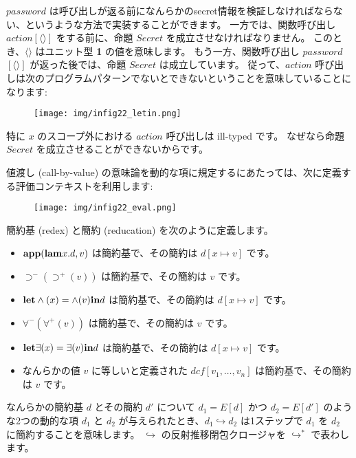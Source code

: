 \documentclass[submit,techreq,noauthor,onecolumn]{ipsj}
\begin{document}
\noindent \underline{$password$} は呼び出しが返る前になんらかのsecret情報を検証しなければならない、というような方法で実装することができます。
一方では、関数呼び出し \underline{$action$}$[\langle\rangle]$ をする前に、命題 \underline{$Secret$} を成立させなければなりません。
このとき、$\langle\rangle$ はユニット型 {\bf 1} の値を意味します。
もう一方、関数呼び出し \underline{$password$}$[\langle\rangle]$ が返った後では、命題 \underline{$Secret$} は成立しています。
従って、\underline{$action$} 呼び出しは次のプログラムパターンでないとできないということを意味していることになります:

\begin{figure}[h]
\centering
\texttt{[image: img/infig22\_letin.png]}
\end{figure}

\noindent 特に $x$ のスコープ外における \underline{$action$} 呼び出しは ill-typed です。
なぜなら命題 \underline{$Secret$} を成立させることができないからです。

値渡し (call-by-value) の意味論を動的な項に規定するにあたっては、次に定義する評価コンテキストを利用します:

\begin{figure}[h]
\centering
\texttt{[image: img/infig22\_eval.png]}
\end{figure}

簡約基 (redex) と簡約 (reducation) を次のように定義します。

\begin{itemize}
  \item ${\bf app}({\bf lam} x.d, v)$ は簡約基で、その簡約は $d[x \mapsto v]$ です。
  \item $\supset^- (\supset^+ (v))$ は簡約基で、その簡約は $v$ です。
  \item ${\bf let} \wedge (x) = \wedge (v) {\bf in} d$ は簡約基で、その簡約は $d[x \mapsto v]$ です。
  \item $\forall^- (\forall^+ (v))$ は簡約基で、その簡約は $v$ です。
  \item ${\bf let} \exists (x) = \exists (v) {\bf in} d$ は簡約基で、その簡約は $d[x \mapsto v]$ です。
  \item なんらかの値 $v$ に等しいと定義された $dcf[v_1,\ldots,v_n]$ は簡約基で、その簡約は $v$ です。
\end{itemize}

\noindent なんらかの簡約基 $d$ とその簡約 $d'$ について $d_1 = E[d]$ かつ $d_2 = E[d']$ のような2つの動的な項 $d_1$ と $d_2$ が与えられたとき、$d_1 \hookrightarrow d_2$ は1ステップで $d_1$ を $d_2$ に簡約することを意味します。
$\hookrightarrow$ の反射推移閉包クロージャを $\hookrightarrow^*$ で表わします。
\end{document}
